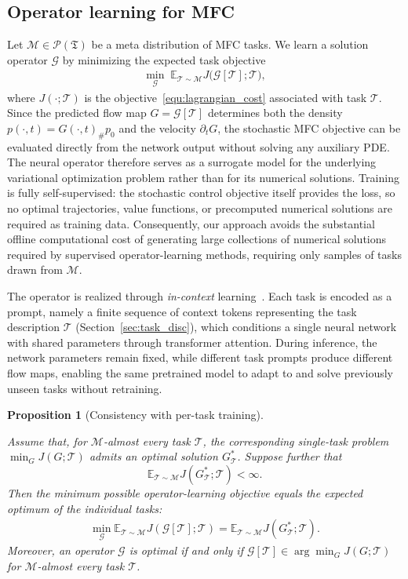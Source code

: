 \documentclass[preprint]{elsarticle}
\newtheorem{proposition}[theorem]{Proposition}
\newcommand{\E}{\mathbb{E}}
\newcommand{\pr}{\mathscr{P}}           %
\newcommand{\sM}{\mathcal{M}}
\newcommand{\sT}{\mathcal{T}}
\newcommand{\sG}{\mathcal{G}}
\begin{document}
\subsection{Operator learning for MFC}\label{sec:op_mfc}

Let $\sM\in\pr(\mathfrak T)$ be a meta distribution of MFC tasks. We learn a solution operator $\sG$ by minimizing the expected task objective
\begin{align}
\min_{\sG}\;
\E_{\sT\sim\sM}
J\bigl(\sG[\sT];\sT\bigr),
\label{equ:sol_op_obj}
\end{align}
where $J(\cdot;\sT)$ is the objective~\eqref{equ:lagrangian_cost} associated with task $\sT$. Since the predicted flow map \(G=\sG[\sT]\) determines both the density \(p(\cdot,t)=G(\cdot,t)_\#p_0\) and the velocity \(\partial_t G\), the stochastic MFC objective can be evaluated directly from the network output without solving any auxiliary PDE. The neural operator therefore serves as a surrogate model for the underlying variational optimization problem rather than for its numerical solutions. Training is fully self-supervised: the stochastic control objective itself provides the loss, so no optimal trajectories, value functions, or precomputed numerical solutions are required as training data. Consequently, our approach avoids the substantial offline computational cost of generating large collections of numerical solutions required by supervised operator-learning methods, requiring only samples of tasks drawn from \(\sM\).

The operator is realized through \emph{in-context} learning~\cite{xie2022an}. Each task is encoded as a prompt, namely a finite sequence of context tokens representing the task description \(\sT\) (Section~\ref{sec:task_disc}), which conditions a single neural network with shared parameters through transformer attention. During inference, the network parameters remain fixed, while different task prompts produce different flow maps, enabling the same pretrained model to adapt to and solve previously unseen tasks without retraining.


\begin{proposition}[Consistency with per-task training]
\label{prop:consistency}

Assume that, for $\sM$-almost every task $\sT$, the corresponding single-task problem $\min_G J(G;\sT)$ admits an optimal solution $G_\sT^*$. Suppose further that 
$$\E_{\sT\sim\sM} J(G_\sT^*;\sT) < \infty.$$
Then the minimum possible operator-learning objective equals the expected optimum of the individual tasks:
\begin{align}
\min_{\sG}
\E_{\sT\sim\sM}
J(\sG[\sT];\sT)
=
\E_{\sT\sim\sM}
J(G_\sT^*;\sT).
\label{equ:consistency}
\end{align}
Moreover, an operator $\sG$ is optimal if and only if $\sG[\sT]\in \arg\min_G J(G;\sT)$ for $\sM$-almost every task $\sT$.
\end{proposition}
\end{document}
